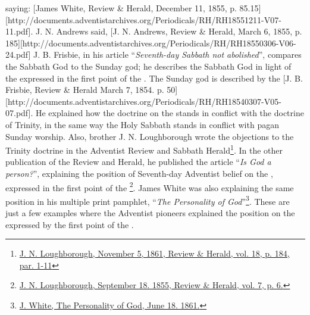 saying: [James White, Review \& Herald, December 11, 1855, p. 85.15][http://documents.adventistarchives.org/Periodicals/RH/RH18551211-V07-11.pdf]. J. N. Andrews said, [J. N. Andrews, Review \& Herald, March 6, 1855, p. 185][http://documents.adventistarchives.org/Periodicals/RH/RH18550306-V06-24.pdf] J. B. Frisbie, in his article “\textit{Seventh-day Sabbath not abolished}”, compares the Sabbath God to the Sunday god; he describes the Sabbath God in light of the  expressed in the first point of the . The Sunday god is described by the [J. B. Frisbie, Review \& Herald March 7, 1854. p. 50][http://documents.adventistarchives.org/Periodicals/RH/RH18540307-V05-07.pdf]. He explained how the doctrine on the  stands in conflict with the doctrine of Trinity, in the same way the Holy Sabbath stands in conflict with pagan Sunday worship. Also, brother J. N. Loughborough wrote the objections to the Trinity doctrine in the Adventist Review and Sabbath Herald\footnote{\href{https://adventistdigitallibrary.org/adl-349160/advent-review-and-sabbath-herald-november-5-1861}{J. N. Loughborough, November 5, 1861, Review \& Herald, vol. 18, p. 184, par. 1-11}}. In the other publication of the Review and Herald, he published the article “\textit{Is God a person?}”, explaining the position of Seventh-day Adventist belief on the , expressed in the first point of the \footnote{\href{http://documents.adventistarchives.org/Periodicals/RH/RH18550918-V07-06.pdf}{J. N. Loughborough, September 18. 1855, Review \& Herald, vol. 7, p. 6.}}. James White was also explaining the same position in his multiple print pamphlet, “\textit{The Personality of God}”\footnote{\href{https://egwwritings.org/?ref=en_PERGO.1.1&para=1471.3}{J. White, The Personality of God, June 18. 1861.}}. These are just a few examples where the Adventist pioneers explained the position on the  expressed by the first point of the .


